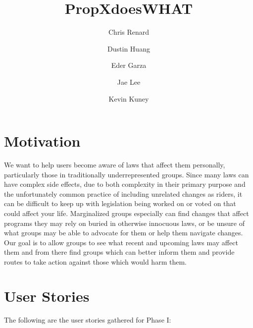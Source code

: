 \documentclass[12pt]{article}
\title{PropXdoesWHAT}
\author{Chris Renard \and Dustin Huang \and Eder Garza \and Jae Lee \and Kevin Kuney}
\date{} %
\begin{document}
\maketitle

\section{Motivation}

We want to help users become aware of laws that affect them personally, particularly those in traditionally underrepresented groups. 
Since many laws can have complex side effects, due to both complexity in their primary purpose and the unfortunately common practice of including unrelated changes as riders, it can be difficult to keep up with legislation being worked on or voted on that could affect your life.
Marginalized groups especially can find changes that affect programs they may rely on buried in otherwise innocuous laws, or be unsure of what groups may be able to advocate for them or help them navigate changes.
Our goal is to allow groups to see what recent and upcoming laws may affect them and from there find groups which can better inform them and provide routes to take action against those which would harm them.


\section{User Stories}

The following are the user stories gathered for Phase I: \vspace{0.5em}
\end{document}
